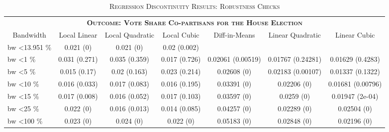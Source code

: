 \begin{table}[!tbp]
\caption{\textsc{Regression Discontinuity Results: Robustness Checks}\label{}} 
\begin{tabular}{lcccccc}
\toprule
\multicolumn{7}{c}{\bfseries \textsc{Outcome: Vote Share Co-partisans for the House Election}}\tabularnewline
\cline{1-7}
\multicolumn{1}{c}{Bandwidth}&\multicolumn{1}{c}{Local Linear}&\multicolumn{1}{c}{Local Quadratic}&\multicolumn{1}{c}{Local Cubic}&\multicolumn{1}{c}{Diff-in-Means}&\multicolumn{1}{c}{Linear Quadratic}&\multicolumn{1}{c}{Linear Cubic}\tabularnewline
\midrule
bw \textless  13.951 \%&0.021 (0)&0.021 (0)&0.02 (0.002)&&&\tabularnewline
bw \textless  1 \%&0.031 (0.271)&0.035 (0.359)&0.017 (0.726)&0.02061 (0.00519)&0.01767 (0.24281)&0.01629 (0.4283)\tabularnewline
bw \textless  5 \%&0.015 (0.17)&0.02 (0.163)&0.023 (0.214)&0.02608 (0)&0.02183 (0.00107)&0.01337 (0.1322)\tabularnewline
bw \textless  10 \%&0.016 (0.033)&0.017 (0.083)&0.016 (0.195)&0.03391 (0)&0.02206 (0)&0.01681 (0.00796)\tabularnewline
bw \textless  15 \%&0.017 (0.008)&0.016 (0.052)&0.017 (0.103)&0.03597 (0)&0.0259 (0)&0.01947 (2e-04)\tabularnewline
bw \textless  25 \%&0.022 (0)&0.016 (0.013)&0.014 (0.085)&0.04257 (0)&0.02289 (0)&0.02504 (0)\tabularnewline
bw \textless  100 \%&0.023 (0)&0.024 (0)&0.022 (0)&0.05183 (0)&0.02848 (0)&0.02196 (0)\tabularnewline
\bottomrule
\end{tabular}
\end{table}
